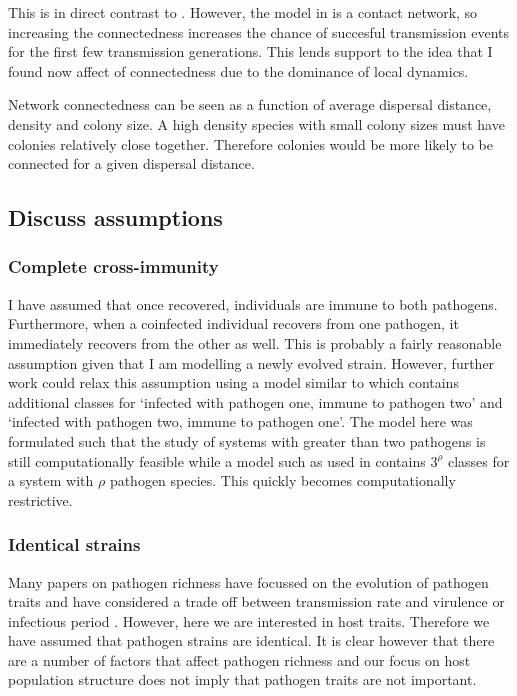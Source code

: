 This is in direct contrast to \cite{campos2006pathogen}. 
However, the model in \cite{campos2006pathogen} is a contact network, so increasing the connectedness increases the chance of succesful transmission events for the first few transmission generations.
This lends support to the idea that I found now affect of connectedness due to the dominance of local dynamics.

Network connectedness can be seen as a function of average dispersal distance, density and colony size.
A high density species with small colony sizes must have colonies relatively close together.
Therefore colonies would be more likely to be connected for a given dispersal distance. 


\subsection{Discuss assumptions}

\subsubsection{Complete cross-immunity}

I have assumed that once recovered, individuals are immune to both pathogens. 
Furthermore, when a coinfected individual recovers from one pathogen, it immediately recovers from the other as well.
This is probably a fairly reasonable assumption given that I am modelling a newly evolved strain.
However, further work could relax this assumption using a model similar to \cite{poletto2015characterising} which contains additional classes for `infected with pathogen one, immune to pathogen two' and `infected with pathogen two, immune to pathogen one'.
The model here was formulated such that the study of systems with greater than two pathogens is still computationally feasible while a model such as used in \cite{poletto2015characterising} contains $3^\rho$ classes for a system with $\rho$ pathogen species.
This quickly becomes computationally restrictive.

\subsubsection{Identical strains}

Many papers on pathogen richness have focussed on the evolution of pathogen traits and have considered a trade off between transmission rate and virulence \cite{nowak1994superinfection, nowak1994superinfection} or infectious period \cite{poletto2013host}.
However, here we are interested in host traits.
Therefore we have assumed that pathogen strains are identical.
It is clear however that there are a number of factors that affect pathogen richness and our focus on host population structure does not imply that pathogen traits are not important.



